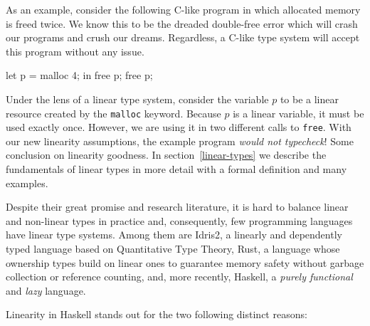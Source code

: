 \documentclass[]{lwnovathesis}
\begin{document}
As an example, consider the following C-like program in which allocated memory
is freed twice. We know this to be the dreaded double-free error which will
crash our programs and crush our dreams. Regardless, a C-like type system will
accept this program without any issue.
\begin{code}
let p = malloc 4;
 in free p;
    free p;
\end{code}

Under the lens of a linear type system, consider the variable $p$ to be a linear
resource created by the \texttt{malloc} keyword. Because $p$ is a linear
variable, it must be used exactly once. However, we are using it in two
different calls to \texttt{free}. With our new linearity assumptions, the
example program \emph{would not typecheck}! Some conclusion on linearity
goodness. In section~\ref{linear-types} we describe the fundamentals of linear
types in more detail with a formal definition and many examples.

Despite their great promise and research literature, it is hard to balance
linear and non-linear types in practice and, consequently, few programming
languages have linear type systems. Among them are Idris2\cite{}, a linearly and
dependently typed language based on Quantitative Type Theory, Rust\cite{}, a
language whose ownership types build on linear ones to guarantee memory safety
without garbage collection or reference counting, and, more recently,
Haskell\cite{}, a \emph{purely functional} and \emph{lazy} language.

Linearity in Haskell stands out %
for the two following distinct reasons:
\end{document}
